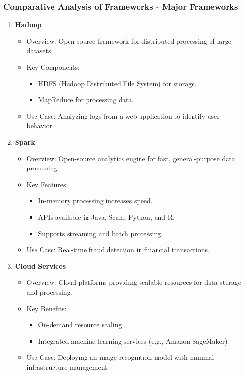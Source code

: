 \documentclass[aspectratio=169]{beamer}
\begin{document}
\begin{frame}[fragile]
    \frametitle{Comparative Analysis of Frameworks - Major Frameworks}
    \begin{enumerate}
        \item \textbf{Hadoop}
            \begin{itemize}
                \item Overview: Open-source framework for distributed processing of large datasets.
                \item Key Components:
                    \begin{itemize}
                        \item HDFS (Hadoop Distributed File System) for storage.
                        \item MapReduce for processing data.
                    \end{itemize}
                \item Use Case: Analyzing logs from a web application to identify user behavior.
            \end{itemize}
        \item \textbf{Spark}
            \begin{itemize}
                \item Overview: Open-source analytics engine for fast, general-purpose data processing.
                \item Key Features:
                    \begin{itemize}
                        \item In-memory processing increases speed.
                        \item APIs available in Java, Scala, Python, and R.
                        \item Supports streaming and batch processing.
                    \end{itemize}
                \item Use Case: Real-time fraud detection in financial transactions.
            \end{itemize}
        \item \textbf{Cloud Services}
            \begin{itemize}
                \item Overview: Cloud platforms providing scalable resources for data storage and processing.
                \item Key Benefits:
                    \begin{itemize}
                        \item On-demand resource scaling.
                        \item Integrated machine learning services (e.g., Amazon SageMaker).
                    \end{itemize}
                \item Use Case: Deploying an image recognition model with minimal infrastructure management.
            \end{itemize}
    \end{enumerate}
\end{frame}
\end{document}
